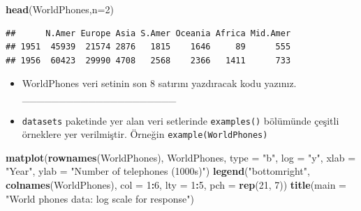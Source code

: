 \documentclass[
  oneside]{book}
\newenvironment{Shaded}{\begin{snugshade}}{\end{snugshade}}
\newcommand{\AttributeTok}[1]{\textcolor[rgb]{0.13,0.29,0.53}{#1}}
\newcommand{\DecValTok}[1]{\textcolor[rgb]{0.00,0.00,0.81}{#1}}
\newcommand{\FunctionTok}[1]{\textcolor[rgb]{0.13,0.29,0.53}{\textbf{#1}}}
\newcommand{\NormalTok}[1]{#1}
\newcommand{\SpecialCharTok}[1]{\textcolor[rgb]{0.81,0.36,0.00}{\textbf{#1}}}
\newcommand{\StringTok}[1]{\textcolor[rgb]{0.31,0.60,0.02}{#1}}
\begin{document}
\begin{Shaded}
\begin{Highlighting}[]
\FunctionTok{head}\NormalTok{(WorldPhones,}\AttributeTok{n=}\DecValTok{2}\NormalTok{)}
\end{Highlighting}
\end{Shaded}

\begin{verbatim}
##      N.Amer Europe Asia S.Amer Oceania Africa Mid.Amer
## 1951  45939  21574 2876   1815    1646     89      555
## 1956  60423  29990 4708   2568    2366   1411      733
\end{verbatim}

\begin{itemize}
\item
  WorldPhones veri setinin son 8 satırını yazdıracak kodu yazınız. \_\_\_\_\_\_\_\_\_\_\_\_\_\_\_\_\_\_\_\_\_
\item
  \texttt{datasets} paketinde yer alan veri setlerinde \texttt{examples()} bölümünde çeşitli örneklere yer verilmiştir. Örneğin \texttt{example(WorldPhones)}
\end{itemize}

\begin{Shaded}
\begin{Highlighting}[]
\FunctionTok{matplot}\NormalTok{(}\FunctionTok{rownames}\NormalTok{(WorldPhones), WorldPhones, }\AttributeTok{type =} \StringTok{"b"}\NormalTok{, }\AttributeTok{log =} \StringTok{"y"}\NormalTok{,}
        \AttributeTok{xlab =} \StringTok{"Year"}\NormalTok{, }\AttributeTok{ylab =} \StringTok{"Number of telephones (1000\textquotesingle{}s)"}\NormalTok{)}
\FunctionTok{legend}\NormalTok{(}\StringTok{"bottomright"}\NormalTok{, }\FunctionTok{colnames}\NormalTok{(WorldPhones), }\AttributeTok{col =} \DecValTok{1}\SpecialCharTok{:}\DecValTok{6}\NormalTok{, }\AttributeTok{lty =} \DecValTok{1}\SpecialCharTok{:}\DecValTok{5}\NormalTok{,}
       \AttributeTok{pch =} \FunctionTok{rep}\NormalTok{(}\DecValTok{21}\NormalTok{, }\DecValTok{7}\NormalTok{))}
\FunctionTok{title}\NormalTok{(}\AttributeTok{main =} \StringTok{"World phones data: log scale for response"}\NormalTok{)}
\end{Highlighting}
\end{Shaded}
\end{document}
